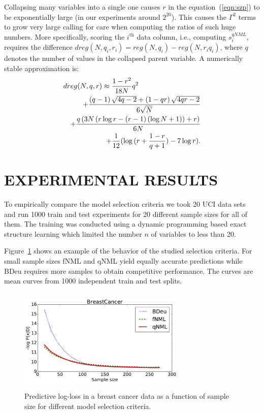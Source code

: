 \documentclass[letterpaper]{article}
\begin{document}
Collapsing many variables into a single one causes $r$ in the
equation~(\ref{eqn:szp}) to be exponentially large (in our experiments
around $2^{20}$).  This causes the $\Gamma^2$ terms to grow very large
calling for care when computing the ratios of such huge numbers. More
specifically, scoring the $i^\text{th}$ data column, i.e., computing
$s^{qNML}_i$, requires the difference $dreg(N,q_i,r_i)=reg(N,q_i) -
reg(N,r_i q_i)$, where $q$ denotes the number of values in the
collapsed parent variable.  A numerically stable approximation is:
\begin{eqnarray}
\lefteqn{dreg(N,q,r)\approx\frac{1-r^2}{18 N} q^{2}} \\
&&+ \frac{\left(q - 1\right) \sqrt{4 q - 2} + \left(1 - q r\right) \sqrt{4 q r - 2}}{6 \sqrt{N}} \nonumber\\
&&+\frac{q\left(3 N \left(r \log{r}  - \left(r - 1\right) \left(\log{N} + 1\right)\right) + r\right)}{6 N} \nonumber\\
&&+ \frac{1}{12}(\log{(r+\frac{1-r}{q+1})}- 7\log{r}).\nonumber
\end{eqnarray}

\section{EXPERIMENTAL RESULTS}

To empirically compare the model selection criteria we took 20 UCI
data sets~\cite{Lichman:2013} and run 1000 train and test experiments
for 20 different sample sizes for all of them. The training was
conducted using a dynamic programming based exact structure
learning\cite{cosco.uai06} which limited the number $n$ of variables
to less than 20.

Figure~\ref{fig:bcmean} shows an example of the behavior of the
studied selection criteria.  For small sample sizes fNML and qNML
yield equally accurate predictions while BDeu requires more samples to
obtain competitive performance. The curves are mean curves from 1000
independent train and test splits.

\begin{figure}
\centering
\includegraphics[width=8cm,height=5cm]{breast_cancer_mean.pdf}
\caption{Predictive log-loss in a breast cancer data as a function of
  sample size for different model selection criteria.}
\label{fig:bcmean}
\end{figure}
\end{document}

